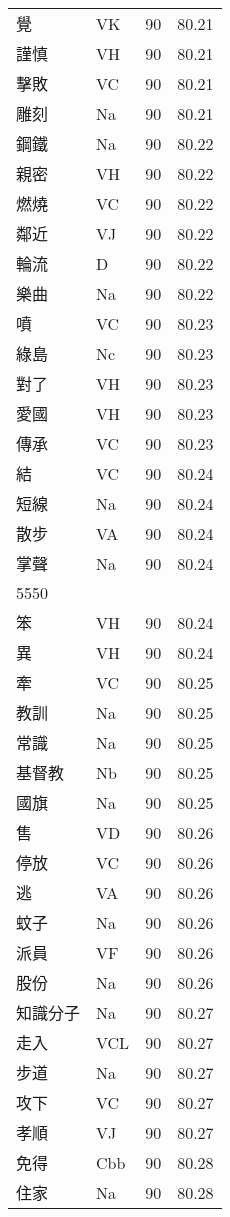\documentclass[twocolumn]{book}
\begin{document}
\begin{supertabular}{llrr}
覺 & VK & 90 &  80.21\\
謹慎 & VH & 90 &  80.21\\
擊敗 & VC & 90 &  80.21\\
雕刻 & Na & 90 &  80.21\\
鋼鐵 & Na & 90 &  80.22\\
親密 & VH & 90 &  80.22\\
燃燒 & VC & 90 &  80.22\\
鄰近 & VJ & 90 &  80.22\\
輪流 & D & 90 &  80.22\\
樂曲 & Na & 90 &  80.22\\
噴 & VC & 90 &  80.23\\
綠島 & Nc & 90 &  80.23\\
對了 & VH & 90 &  80.23\\
愛國 & VH & 90 &  80.23\\
傳承 & VC & 90 &  80.23\\
結 & VC & 90 &  80.24\\
短線 & Na & 90 &  80.24\\
散步 & VA & 90 &  80.24\\
掌聲 & Na & 90 &  80.24\\
5550\\
笨 & VH & 90 &  80.24\\
異 & VH & 90 &  80.24\\
牽 & VC & 90 &  80.25\\
教訓 & Na & 90 &  80.25\\
常識 & Na & 90 &  80.25\\
基督教 & Nb & 90 &  80.25\\
國旗 & Na & 90 &  80.25\\
售 & VD & 90 &  80.26\\
停放 & VC & 90 &  80.26\\
逃 & VA & 90 &  80.26\\
蚊子 & Na & 90 &  80.26\\
派員 & VF & 90 &  80.26\\
股份 & Na & 90 &  80.26\\
知識分子 & Na & 90 &  80.27\\
走入 & VCL & 90 &  80.27\\
步道 & Na & 90 &  80.27\\
攻下 & VC & 90 &  80.27\\
孝順 & VJ & 90 &  80.27\\
免得 & Cbb & 90 &  80.28\\
住家 & Na & 90 &  80.28\\

\end{supertabular}
\end{document}
